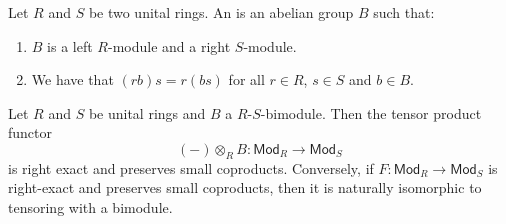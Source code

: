 \begin{definition}[Bimodule]
	Let $R$ and $S$ be two unital rings. An  is an abelian group $B$ such that:
	\begin{enumerate}[label = \textup{(}\alph*\textup{)},wide = 0pt]
		\item $B$ is a left $R$-module and a right $S$-module.
		\item We have that $(rb)s = r(bs)$ for all $r \in R$, $s \in S$ and $b \in B$.
	\end{enumerate}
\end{definition}

\begin{theorem}
	Let $R$ and $S$ be unital rings and $B$ a $R$-$S$-bimodule. Then the tensor product functor
	\begin{equation*}
		(-)\otimes_R B : \mathsf{Mod}_R \to \mathsf{Mod}_S
	\end{equation*}
	\noindent is right exact and preserves small coproducts. Conversely, if $F : \mathsf{Mod}_R \to \mathsf{Mod}_S$ is right-exact and preserves small coproducts, then it is naturally isomorphic to tensoring with a bimodule.
\end{theorem}

\printbibliography

